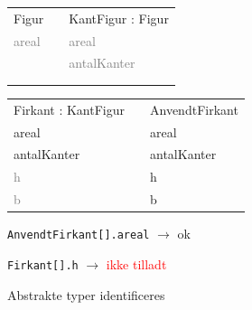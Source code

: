 \begin{frame}[fragile] 
\begin{table}[h]
\begin{tabular}{|l|l|l|}
 \cline{1-1} \cline{3-3} 
Figur          &  & KantFigur : Figur    \\ \cline{1-1} \cline{3-3} 
\textcolor{gray}{areal} &  & \textcolor{gray}{areal}       \\
               &  & \textcolor{gray}{antalKanter} \\
               &  &                      \\
               &  &                      \\ \cline{1-1} \cline{3-3} 
\end{tabular}
\end{table}
\begin{table}[h]
\begin{tabular}{|l|l|l|}
 \cline{1-1} \cline{3-3} 
Firkant : KantFigur &  & AnvendtFirkant       \\ \cline{1-1} \cline{3-3} 
areal               &  & areal                \\
antalKanter         &  & antalKanter          \\
\textcolor{gray}{h}          &  & h                    \\
\textcolor{gray}{b}          &  & b                    \\ \cline{1-1} \cline{3-3} 
\end{tabular}
\end{table}
\begin{center}
\texttt{AnvendtFirkant[].areal} $\rightarrow$ ok

\texttt{Firkant[].h} $\rightarrow$ \textcolor{red}{ikke tilladt}

Abstrakte typer identificeres
\end{center}
\end{frame}

